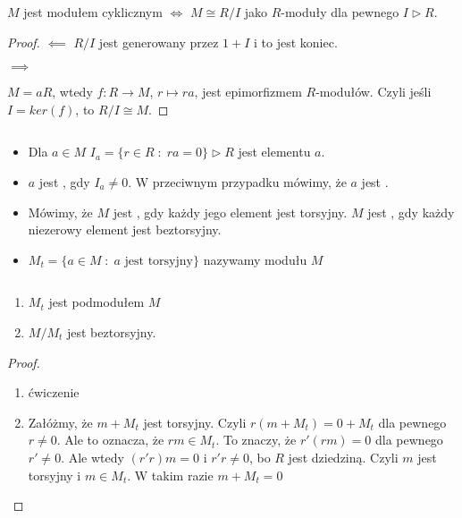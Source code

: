 \begin{remark}
  $M$ jest modułem cyklicznym $\iff$ $M\cong R/I$ jako $R$-moduły dla pewnego $I\triangleright R$.
\end{remark}
\begin{proof}
  $\impliedby$ $R/I$ jest generowany przez $1+I$ i to jest koniec.

  $\implies$

  $M=aR$, wtedy $f:R\to M$, $r\mapsto ra$, jest epimorfizmem $R$-modułów. Czyli jeśli $I=ker(f)$, to $R/I\cong M$.
\end{proof}

\begin{definition}$ $

  \begin{itemize}
    \item[\PHtunny] Dla $a\in M$ $I_a=\{r\in R\;:\;ra=0\}\triangleright R$ jest  elementu $a$.
    \item[\PHtunny] $a$ jest , gdy $I_a\neq 0$. W przeciwnym przypadku mówimy, że $a$ jest .
    \item[\PHtunny] Mówimy, że $M$ jest , gdy każdy jego element jest torsyjny. $M$ jest , gdy każdy niezerowy element jest beztorsyjny.
    \item[\PHtunny] $M_t=\{a\in M\;:\;a\text{ jest torsyjny}\}$ nazywamy  modułu $M$
  \end{itemize}
\end{definition}

\begin{remark}$ $

  \begin{enumerate}
    \item $M_t$ jest podmodułem $M$
    \item $M/M_t$ jest beztorsyjny.
  \end{enumerate}
\end{remark}
\begin{proof}$ $

  \begin{enumerate}
    \item ćwiczenie
    \item Załóżmy, że $m+M_t$ jest torsyjny. Czyli $r(m+M_t)=0+M_t$ dla pewnego $r\neq 0$. Ale to oznacza, że $rm\in M_t$. To znaczy, że $r'(rm)=0$ dla pewnego $r'\neq 0$. Ale wtedy $(r'r)m=0$ i $r'r\neq 0$, bo $R$ jest dziedziną. Czyli $m$ jest torsyjny i $m\in M_t$. W takim razie $m+M_t=0$ 
  \end{enumerate}
\end{proof}

